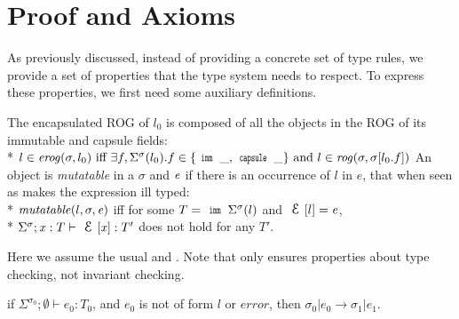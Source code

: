 \clearpage
\section{Proof and Axioms}
\label{s:proof}

As previously discussed, instead of providing a concrete set of type rules, we provide a set of properties
that the type system needs to respect.
To express these properties, we first need some auxiliary definitions.


The encapsulated ROG of $l_0$ is composed of all the objects
in the ROG of its immutable and capsule fields:\\*
\indent $l \in \mathit{erog}(\sigma,l_0)
\text{ iff } \exists f, \Sigma^\sigma(l_0).f \in \{\Kw{imm}\,\_,\Kw{capsule}\,\_\}
\text{ and } l \in \mathit{rog}(\sigma, \sigma[l_0.f])$%
{}
\noindent An object is \emph{mutatable} in a $\sigma$ and  ${\mathit{e}}$ if there is an occurrence of 
$l$ in $e$, that when seen as \Q@imm@ makes the expression ill typed:\\*
\indent $\mathit{mutatable}(l,\sigma,{\mathit{e}})$ iff for some $T=\Kw{imm}\,\Sigma^\sigma(l)$ and $\ctx[l]=\e$,\\*
\indent \indent $\Sigma^\sigma;\x:T\vdash\ctx[\x]:T'$ does not hold for any $T'$.



Here we assume the usual  and . Note that  only ensures properties about type checking, not invariant checking.\saveSpace\saveSpace
\begin{Assumption}[Progress]\rm
	if $\Sigma^{\sigma_0};\emptyset\vdash e_0: T_0$,
	and $e_0$ is not of form $l$ or $\mathit{error}$, then
	$\sigma_0|e_0\rightarrow \sigma_1|e_1$.
\end{Assumption}

